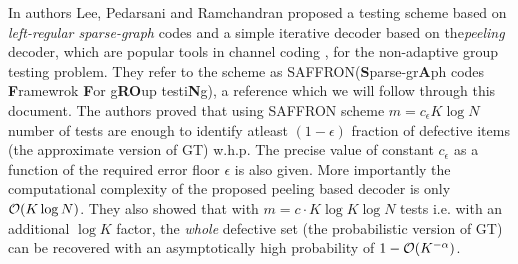 In \cite{lee2015saffron} authors Lee, Pedarsani and Ramchandran proposed a testing scheme based on \textit{left-regular sparse-graph} codes and a simple iterative decoder based on the\textit{peeling} decoder, which are popular tools in channel coding \cite{richardson2008modern}, for the non-adaptive group testing problem. They refer to the scheme as SAFFRON(\textbf{S}parse-gr\textbf{A}ph codes \textbf{F}ramewrok \textbf{F}or g\textbf{RO}up testi\textbf{N}g), a reference which we will follow through this document. The authors proved that using SAFFRON scheme $m=c_\epsilon K\log N$ number of tests are enough to identify atleast $(1-\epsilon)$ fraction of defective items (the approximate version of GT) w.h.p. The precise value of constant $c_\epsilon$ as a function of the required error floor $\epsilon$ is also given. More importantly the computational complexity of the proposed peeling based decoder is only $\mathcal{O}(K\log N)$. They also showed that with $m=c\cdot K\log K \log N$ tests  i.e. with an additional $\log K$ factor, the \textit{whole} defective set (the probabilistic version of GT) can be recovered with an asymptotically high probability of $1-\mathcal{O}(K^{-\alpha})$.

